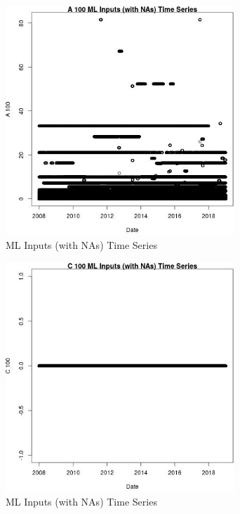 \begin{figure} 
\centering  
\includegraphics[width=0.77\textwidth]{Code_Outputs/Report_ML_input_PM25_Step4_part_f_de_duplicated_aves_prioritize_24hr_obswNAs_A_100vDate.jpg} 
\caption{\label{fig:Report_ML_input_PM25_Step4_part_f_de_duplicated_aves_prioritize_24hr_obswNAsA_100vDate}ML Inputs (with NAs) Time Series} 
\end{figure} 
 

\begin{figure} 
\centering  
\includegraphics[width=0.77\textwidth]{Code_Outputs/Report_ML_input_PM25_Step4_part_f_de_duplicated_aves_prioritize_24hr_obswNAs_C_100vDate.jpg} 
\caption{\label{fig:Report_ML_input_PM25_Step4_part_f_de_duplicated_aves_prioritize_24hr_obswNAsC_100vDate}ML Inputs (with NAs) Time Series} 
\end{figure} 
 

